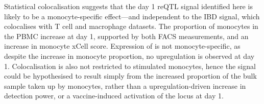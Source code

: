 Statistical colocalisation suggests that the day 1 reQTL signal identified here is likely to be a monocyte-specific effect---and independent to the IBD signal, which colocalises with T cell and macrophage datasets.
The proportion of monocytes in the PBMC increase at day 1, supported by both FACS\autocite{sobolev2016AdjuvantedInfluenzaH1N1Vaccination} measurements, and an increase in monocyte xCell score.
Expression of  is not monocyte-specific, as despite the increase in monocyte proportion, no upregulation is observed at day 1.
Colocalisation is also not restricted to stimulated monocytes,
hence the signal could be hypothesised to result simply from the increased proportion of the bulk sample taken up by monocytes,
rather than a upregulation-driven increase in detection power,
or a vaccine-induced activation of the locus at day 1.

